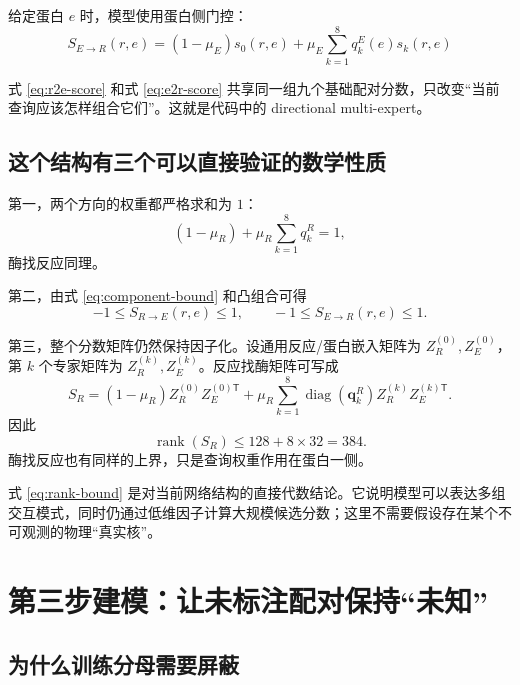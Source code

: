 \documentclass[UTF8,11pt,a4paper]{ctexart}
\newcommand{\diag}{\operatorname{diag}}
\begin{document}
给定蛋白 $e$ 时，模型使用蛋白侧门控：
\begin{equation}
\boxed{
S_{E\rightarrow R}(r,e)
=
(1-\mu_E)s_0(r,e)
+
\mu_E\sum_{k=1}^{8}q_k^E(e)s_k(r,e)
}
\label{eq:e2r-score}
\end{equation}

式 \eqref{eq:r2e-score} 和式 \eqref{eq:e2r-score} 共享同一组九个基础配对分数，只改变“当前查询应该怎样组合它们”。这就是代码中的 directional multi-expert。

\subsection{这个结构有三个可以直接验证的数学性质}

第一，两个方向的权重都严格求和为 $1$：
\begin{equation}
(1-\mu_R)+\mu_R\sum_{k=1}^{8}q_k^R=1,
\end{equation}
酶找反应同理。

第二，由式 \eqref{eq:component-bound} 和凸组合可得
\begin{equation}
-1\le S_{R\rightarrow E}(r,e)\le1,
\qquad
-1\le S_{E\rightarrow R}(r,e)\le1.
\label{eq:score-bound}
\end{equation}

第三，整个分数矩阵仍然保持因子化。设通用反应/蛋白嵌入矩阵为 $Z_R^{(0)},Z_E^{(0)}$，第 $k$ 个专家矩阵为 $Z_R^{(k)},Z_E^{(k)}$。反应找酶矩阵可写成
\begin{equation}
S_R
=
(1-\mu_R)Z_R^{(0)}Z_E^{(0)\mathsf T}
+
\mu_R\sum_{k=1}^{8}
\diag(\bm q_k^R)
Z_R^{(k)}Z_E^{(k)\mathsf T}.
\label{eq:r2e-matrix}
\end{equation}
因此
\begin{equation}
\operatorname{rank}(S_R)
\le128+8\times32=384.
\label{eq:rank-bound}
\end{equation}
酶找反应也有同样的上界，只是查询权重作用在蛋白一侧。

\begin{keybox}
式 \eqref{eq:rank-bound} 是对当前网络结构的直接代数结论。它说明模型可以表达多组交互模式，同时仍通过低维因子计算大规模候选分数；这里不需要假设存在某个不可观测的物理“真实核”。
\end{keybox}

\section{第三步建模：让未标注配对保持“未知”}

\subsection{为什么训练分母需要屏蔽}
\end{document}
